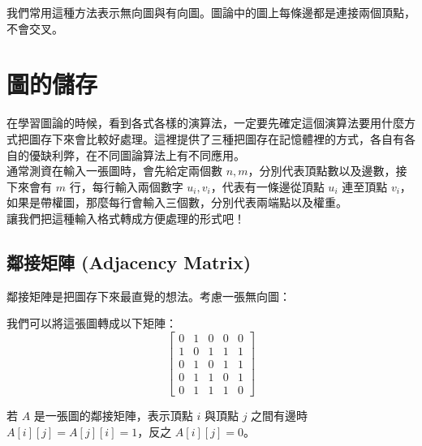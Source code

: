 \documentclass[main.tex]{subfiles}
\begin{document}
我們常用這種方法表示無向圖與有向圖。圖論中的圖上每條邊都是連接兩個頂點，不會交叉。

\section{圖的儲存}
在學習圖論的時候，看到各式各樣的演算法，一定要先確定這個演算法要用什麼方式把圖存下來會比較好處理。這裡提供了三種把圖存在記憶體裡的方式，各自有各自的優缺利弊，在不同圖論算法上有不同應用。\\

通常測資在輸入一張圖時，會先給定兩個數 $n, m$，分別代表頂點數以及邊數，接下來會有 $m$ 行，每行輸入兩個數字 $u_i, v_i$，代表有一條邊從頂點 $u_i$ 連至頂點 $v_i$，如果是帶權圖，那麼每行會輸入三個數，分別代表兩端點以及權重。\\

讓我們把這種輸入格式轉成方便處理的形式吧！

\subsection{鄰接矩陣 (Adjacency Matrix)}
鄰接矩陣是把圖存下來最直覺的想法。考慮一張無向圖：
\begin{center}
\end{center}

我們可以將這張圖轉成以下矩陣：
\begin{displaymath}
\begin{bmatrix}
0 & 1 & 0 & 0 & 0\\
1 & 0 & 1 & 1 & 1\\
0 & 1 & 0 & 1 & 1\\
0 & 1 & 1 & 0 & 1\\
0 & 1 & 1 & 1 & 0
\end{bmatrix}
\end{displaymath}

若 $A$ 是一張圖的鄰接矩陣，表示頂點 $i$ 與頂點 $j$ 之間有邊時 $A[i][j] = A[j][i] = 1$，反之 $A[i][j] = 0$。\\

\end{document}
